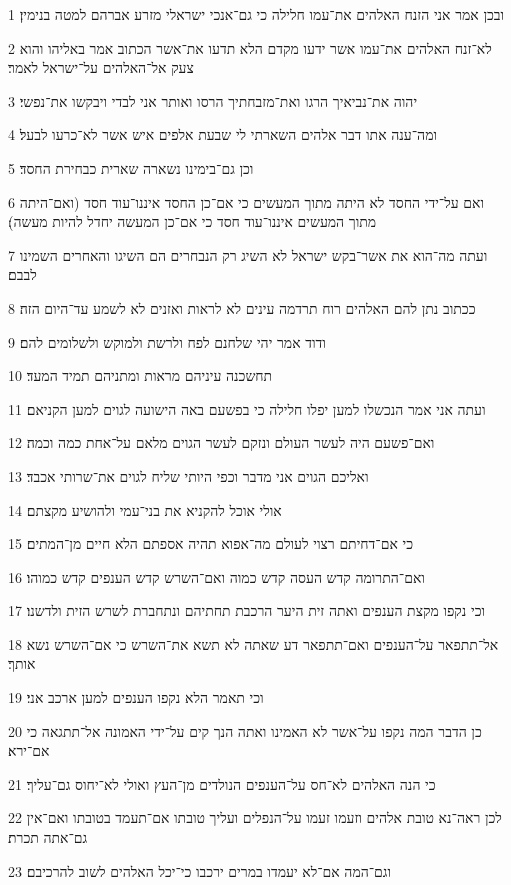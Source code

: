 \par 1 ובכן אמר אני הזנח האלהים את־עמו חלילה כי גם־אנכי ישראלי מזרע אברהם למטה בנימין׃
\par 2 לא־זנח האלהים את־עמו אשר ידעו מקדם הלא תדעו את־אשר הכתוב אמר באליהו והוא צעק אל־האלהים על־ישראל לאמר׃
\par 3 יהוה את־נביאיך הרגו ואת־מזבחתיך הרסו ואותר אני לבדי ויבקשו את־נפשי׃
\par 4 ומה־ענה אתו דבר אלהים השארתי לי שבעת אלפים איש אשר לא־כרעו לבעל׃
\par 5 וכן גם־בימינו נשארה שארית כבחירת החסד׃
\par 6 ואם על־ידי החסד לא היתה מתוך המעשים כי אם־כן החסד איננו־עוד חסד (ואם־היתה מתוך המעשים איננו־עוד חסד כי אם־כן המעשה יחדל להיות מעשה)׃
\par 7 ועתה מה־הוא את אשר־בקש ישראל לא השיג רק הנבחרים הם השיגו והאחרים השמינו לבבם׃
\par 8 ככתוב נתן להם האלהים רוח תרדמה עינים לא לראות ואזנים לא לשמע עד־היום הזה׃
\par 9 ודוד אמר יהי שלחנם לפח ולרשת ולמוקש ולשלומים להם׃
\par 10 תחשכנה עיניהם מראות ומתניהם תמיד המעד׃
\par 11 ועתה אני אמר הנכשלו למען יפלו חלילה כי בפשעם באה הישועה לגוים למען הקניאם׃
\par 12 ואם־פשעם היה לעשר העולם ונזקם לעשר הגוים מלאם על־אחת כמה וכמה׃
\par 13 ואליכם הגוים אני מדבר וכפי היותי שליח לגוים את־שרותי אכבד׃
\par 14 אולי אוכל להקניא את בני־עמי ולהושיע מקצתם׃
\par 15 כי אם־דחיתם רצוי לעולם מה־אפוא תהיה אספתם הלא חיים מן־המתים׃
\par 16 ואם־התרומה קדש העסה קדש כמוה ואם־השרש קדש הענפים קדש כמוהו׃
\par 17 וכי נקפו מקצת הענפים ואתה זית היער הרכבת תחתיהם ונתחברת לשרש הזית ולדשנו׃
\par 18 אל־תתפאר על־הענפים ואם־תתפאר דע שאתה לא תשא את־השרש כי אם־השרש נשא אותך׃
\par 19 וכי תאמר הלא נקפו הענפים למען ארכב אני׃
\par 20 כן הדבר המה נקפו על־אשר לא האמינו ואתה הנך קים על־ידי האמונה אל־תתגאה כי אם־ירא׃
\par 21 כי הנה האלהים לא־חס על־הענפים הנולדים מן־העץ ואולי לא־יחוס גם־עליך׃
\par 22 לכן ראה־נא טובת אלהים וזעמו זעמו על־הנפלים ועליך טובתו אם־תעמד בטובתו ואם־אין גם־אתה תכרת׃
\par 23 וגם־המה אם־לא יעמדו במרים ירכבו כי־יכל האלהים לשוב להרכיבם׃
